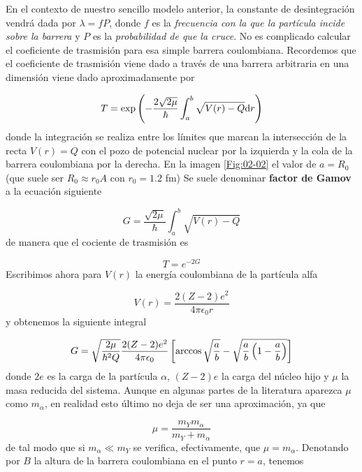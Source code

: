 En el contexto de nuestro sencillo modelo anterior, la constante de desintegración vendrá dada por $\lambda = fP$, donde $f$ es la \textit{frecuencia con la que la partícula incide sobre la barrera} y $P$ es la \textit{probabilidad de que la cruce}. No es complicado calcular el coeficiente de trasmisión para esa simple barrera coulombiana. Recordemos que el coeficiente de trasmisión viene dado a través de una barrera arbitraria en una dimensión viene dado aproximadamente por

\begin{equation}
    T = \exp \left( -\frac{2\sqrt{2\mu}}{\hbar } \int_a^b \sqrt{V(r)-Q}\mathrm{d} r \right)
\end{equation}
donde la integración se realiza entre los límites que marcan la intersección de la recta $V(r) = Q$ con el pozo de potencial nuclear por la izquierda y la cola de la barrera coulombiana por la derecha. En la imagen \ref{Fig:02-02} el valor de $a=R_0$ (que suele ser $R_0\approx r_0A$ con $r_0=1.2$ fm) Se suele denominar \textbf{factor de Gamov} a la ecuación siguiente

\begin{equation}
    G = \frac{\sqrt{2\mu}}{\hbar} \int_a^b \sqrt{V(r)-Q}
\end{equation}
de manera que el cociente de trasmisión es

\begin{equation}
    T = e^{-2G}
\end{equation}
Escribimos ahora para $V(r)$ la energía coulombiana de la partícula alfa 

\begin{equation}
    V(r) = \frac{2(Z-2)e^2}{4\pi \epsilon_0 r}
\end{equation}
y obtenemos la siguiente integral

\begin{equation}
    G = \sqrt{\frac{2\mu}{\hbar^2Q}} \frac{2(Z-2)e^2}{4 \pi \epsilon_0} \left[ \arccos \sqrt{\frac{a}{b}}- \sqrt{\frac{a}{b}\left( 1-\frac{a}{b} \right)} \right]
\end{equation}
donde $2e$ es la carga de la partícula $\alpha$, $(Z-2)e$ la carga del núcleo hijo y $\mu$ la masa reducida del sistema. Aunque en algunas partes de la literatura aparezca $\mu$ como $m_\alpha$, en realidad esto último no deja de ser una aproximación, ya que 

\begin{equation*}
	\mu = \frac{m_Y m_\alpha}{m_Y + m_\alpha} 
\end{equation*}
de tal modo que si $m_\alpha \ll m_Y$ se verifica, efectivamente, que $\mu=m_\alpha$. Denotando por $B$ la altura de la barrera coulombiana en el punto $r=a$, tenemos 

